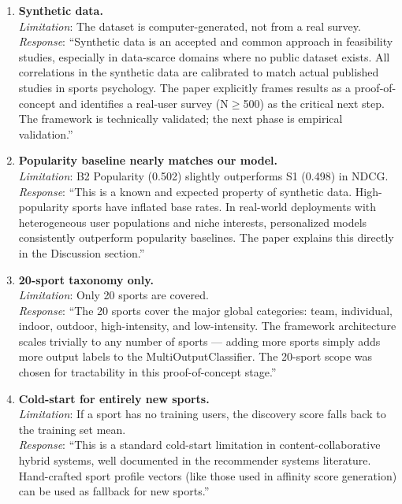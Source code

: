 \documentclass[12pt,a4paper]{article}
\begin{document}
\begin{enumerate}[leftmargin=*, label=\textbf{L\arabic*.}]

\item \textbf{Synthetic data.}\\
\textit{Limitation}: The dataset is computer-generated, not from a real survey.\\
\textit{Response}: ``Synthetic data is an accepted and common approach in
feasibility studies, especially in data-scarce domains where no public dataset
exists. All correlations in the synthetic data are calibrated to match actual
published studies in sports psychology. The paper explicitly frames results as
a proof-of-concept and identifies a real-user survey (N$\geq$500) as the
critical next step. The framework is technically validated; the next phase is
empirical validation.''

\item \textbf{Popularity baseline nearly matches our model.}\\
\textit{Limitation}: B2 Popularity (0.502) slightly outperforms S1 (0.498) in NDCG.\\
\textit{Response}: ``This is a known and expected property of synthetic data.
High-popularity sports have inflated base rates. In real-world deployments
with heterogeneous user populations and niche interests, personalized models
consistently outperform popularity baselines. The paper explains this directly
in the Discussion section.''

\item \textbf{20-sport taxonomy only.}\\
\textit{Limitation}: Only 20 sports are covered.\\
\textit{Response}: ``The 20 sports cover the major global categories: team,
individual, indoor, outdoor, high-intensity, and low-intensity. The framework
architecture scales trivially to any number of sports --- adding more sports
simply adds more output labels to the MultiOutputClassifier. The 20-sport
scope was chosen for tractability in this proof-of-concept stage.''

\item \textbf{Cold-start for entirely new sports.}\\
\textit{Limitation}: If a sport has no training users, the discovery score
falls back to the training set mean.\\
\textit{Response}: ``This is a standard cold-start limitation in
content-collaborative hybrid systems, well documented in the recommender
systems literature. Hand-crafted sport profile vectors (like those used in
affinity score generation) can be used as fallback for new sports.''


\end{enumerate}
\end{document}
